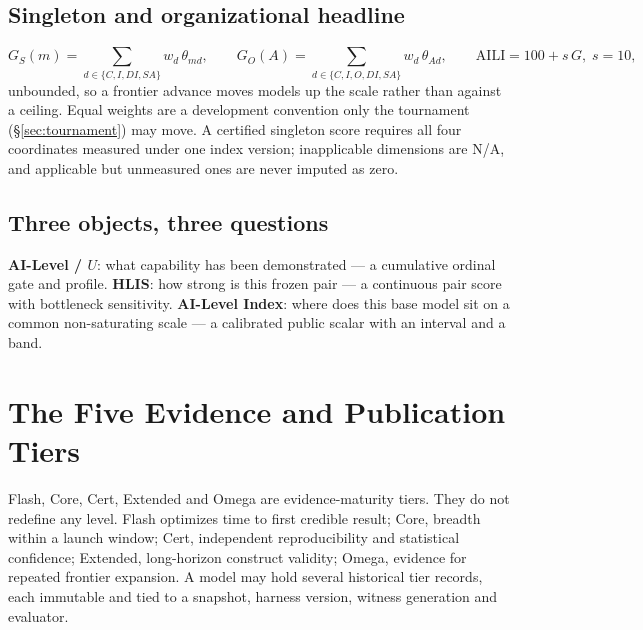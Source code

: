 \subsection{Singleton and organizational headline}
\[
G_S(m) = \sum_{d \in \{C, I, DI, SA\}} w_d\,\theta_{md}, \qquad
G_O(A) = \sum_{d \in \{C, I, O, DI, SA\}} w_d\,\theta_{Ad}, \qquad
\mathrm{AILI} = 100 + s\,G, \; s = 10 ,
\]
unbounded, so a frontier advance moves models up the scale rather than against a ceiling. Equal weights are a development convention only the tournament (\S\ref{sec:tournament}) may move. A certified singleton score requires all four coordinates measured under one index version; inapplicable dimensions are N/A, and applicable but unmeasured ones are never imputed as zero.

\subsection{Three objects, three questions}
\textbf{AI-Level / $U$}: what capability has been demonstrated --- a cumulative ordinal gate and profile. \textbf{HLIS}: how strong is this frozen pair --- a continuous pair score with bottleneck sensitivity. \textbf{AI-Level Index}: where does this base model sit on a common non-saturating scale --- a calibrated public scalar with an interval and a band.

\section{The Five Evidence and Publication Tiers}\label{sec:tiers}

Flash, Core, Cert, Extended and Omega are evidence-maturity tiers. They do not redefine any level. Flash optimizes time to first credible result; Core, breadth within a launch window; Cert, independent reproducibility and statistical confidence; Extended, long-horizon construct validity; Omega, evidence for repeated frontier expansion. A model may hold several historical tier records, each immutable and tied to a snapshot, harness version, witness generation and evaluator.

